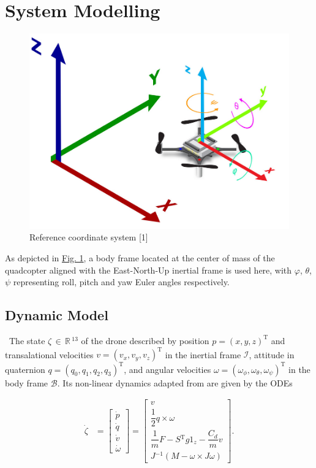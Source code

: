 \documentclass[conference]{IEEEtran}
\begin{document}
\section{System Modelling}\label{Section2}
\begin{figure}[htbp]
	\centerline{\includegraphics[scale = 0.4]{figures/ordinate.png} }
	\caption{Reference coordinate system [1]}
	\label{Fig1}
\end{figure}
As depicted in \hyperref[Fig1]{Fig. 1}, a body frame located at the center of mass of the quadcopter aligned with the East-North-Up inertial frame is used here, with $\varphi$, $\theta$, $\psi$ representing roll, pitch and yaw Euler angles respectively.

\subsection{Dynamic Model}\
The state ${\zeta\,\in\,\mathbb{R}\,\mathrm{^{13}}}$ of the drone described by position ${p = (x, y, z)^{\mathrm{T}}}$ and transalational velocities ${v = (v_x, v_y, v_z)^\mathrm{T}}$ in the inertial frame $\mathcal{I}$, attitude in quaternion ${q = (q_{0}, q_{1}, q_{2}, q_{3})^{\mathrm{T}}}$, and angular velocities ${\omega = (\omega_{\phi}, \omega_{\theta}, \omega_{\psi})^{\mathrm{T}}}$ in the body frame $\mathcal{B}$. Its non-linear dynamics adapted from \cite{carlos_efficient_2020} are given by the ODEs

\begin{align}
\dot{\zeta} &= \begin{bmatrix}
	\dot{p} \\
	\dot{q}\\
	\dot{v}\\
	\dot{\omega}
\end{bmatrix} =
\begin{bmatrix}
    v \\
    \dfrac{1}{2}q\times \omega\\
    \dfrac{1}{m}F - S\mathrm{^{T}}g1_z - \dfrac{C_d}{m} v\\
    J\mathrm{^{-1}}\left(M - \omega \times J \omega\right)
\end{bmatrix}.
\end{align}
\end{document}
